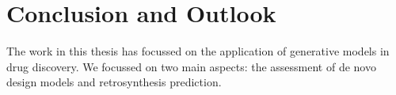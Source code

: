 \chapter{Conclusion and Outlook\label{chap:conclusion}}
The work in this thesis has focussed on the application of generative models in drug discovery.
We focussed on two main aspects: the assessment of de novo design models and retrosynthesis prediction.


